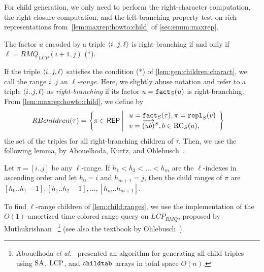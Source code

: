 For child generation, we only need to perform the right-character computation, the right-closure computation, and the left-branching property test on rich representations from~\cref{lem:maxrep:howto:child} of \cref{sec:enum:maxrep}.

\begin{lemma}\label{lem:gen:children:charact}
  The factor $u$ encoded by a triple $\langle i..j, \ell\rangle$ is right-branching if and only if $\ell = RMQ_{LCP}(i+1, j)$ (*). 
\end{lemma}

If the triple $\langle i..j, \ell\rangle$ satisfies the condition (*) of \cref{lem:gen:children:charact}, we call the range $i..j$ an \textit{$\ell$-range}.
Here, we slightly abuse notation and refer to a triple $\langle i..j, \ell\rangle$ as \textit{right-branching} if its factor $u = \mathtt{fact}_{S}(u)$ is right-branching. From \cref{lem:maxrep:howto:child}, we define by 
\begin{align}
  RBchildren(\tau)
  &= \left\{ \pi \in \mathsf{REP}
    \:\middle|\: 
    \begin{array}{l}
    u = \mathtt{fact}_{S}(\tau), 
    \pi = \mathtt{repl}_{S}(v)
    \\
    v = \overrightarrow{(ub)}^{S},
    b \in \mathrm{RC}_{S}(u),
    \end{array}
    \right\}
\end{align}
the set of the triples for all right-branching children of $\tau$. 
Then, we use the following lemma, by Abouelhoda, Kurtz, and Ohlebusch~\cite{abouelhoda2004replacing}. 

\begin{lemma}\label{lem:child:ranges}
  Let $\pi = [i..j]$ be any $\ell$-range.
  If $h_1 < h_2 < \dots < h_m$ are the $\ell$-indexes in ascending order and let $h_0 = i$ and $h_{m+1} = j$, then the child ranges of $\pi$ are
  $[h_0..h_1-1], 
   [h_1..h_2-1], 
   \ldots,
   [h_m..h_{m+1}]$.  
\end{lemma}

To find $\ell$-range children of \cref{lem:child:ranges}, we use the implementation of the $O(1)$-amortized time colored range query on $LCP_{RMQ}$, proposed by Muthukrishnan~\cite{muthukrishnan2002efficient}%
\footnote{
Abouelhoda \textit{et al.}~\cite{abouelhoda2004replacing} presented an algorithm for generating all child triples using 
$\mathrm{SA}$, $\mathrm{LCP}$, and $\mathtt{childtab}$ arrays in total space $O(n)$. 
}
(see also the textbook by Ohlebusch~\cite{ohlebusch2013bookbioinfo}).

